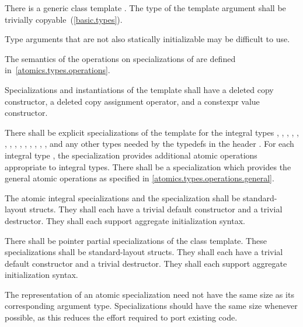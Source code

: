 %
\pnum
There is a generic class template . The type of the template argument
 shall be trivially copyable~(\ref{basic.types}). \begin{note} Type arguments that are
not also statically initializable may be difficult to use. \end{note}

\pnum
The semantics of the operations on specializations of  are defined
in~\ref{atomics.types.operations}.

\pnum
Specializations and instantiations of the  template shall have a deleted copy constructor, a deleted
copy assignment operator, and a constexpr value constructor.

%
\pnum
There shall be explicit specializations of the 
template for the integral types
,
,
,
,
,
,
,
,
,
,
,
,
,
,
and any other types needed by the typedefs in the header .
For each integral type , the specialization
 provides additional atomic operations appropriate to integral types.
There shall be a specialization  which provides the general
atomic operations as specified in \ref{atomics.types.operations.general}.

\pnum
The atomic integral specializations and the specialization 
shall be standard-layout structs. They shall each have a trivial default constructor
and a trivial destructor. They shall each support aggregate initialization
syntax.

%
\pnum
There shall be pointer partial specializations of the  class template.
These specializations shall be standard-layout structs.
They shall each have a trivial default constructor and a trivial destructor.
They shall each support aggregate initialization syntax.

\pnum
\begin{note} The representation of an atomic specialization need not have the same size as its
corresponding argument type. Specializations should have the same size whenever possible, as
this reduces the effort required to port existing code. \end{note}

